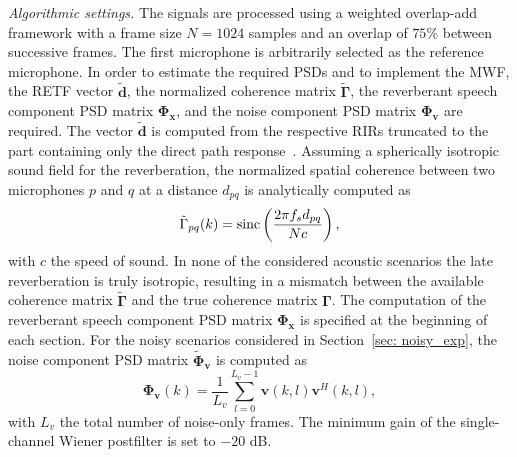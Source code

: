 \documentclass[10pt]{IEEEtran}
\begin{document}
{\emph{Algorithmic settings.}} \enspace
The signals are processed using a weighted overlap-add framework with a frame size $N = 1024$ samples and an overlap of $75 \%$ between successive frames. 
The first microphone is arbitrarily selected as the reference microphone.
In order to estimate the required PSDs and to implement the MWF, the RETF vector $\tilde{\mathbf{d}}$, the normalized coherence matrix $\tilde{\boldsymbol{\Gamma}}$, the reverberant speech component PSD matrix ${\mathbf{\Phi}}_{\mathbf{x}}$, and the noise component PSD matrix $\mathbf{\Phi}_{\mathbf{v}}$ are required.
The vector $\tilde{\mathbf{d}}$ is computed from the respective RIRs truncated to the part containing only the direct path response~\cite{Kuklasinski_EUSIPCO_2014g,Kuklasinksi_ICASSP_2015,kuklasinski_AES_2016}.
Assuming a spherically isotropic sound field for the reverberation, the normalized spatial coherence between two microphones $p$ and $q$ at a distance $d_{pq}$ is analytically computed as
\begin{equation}
\tilde{\Gamma}_{pq}(k) = {\rm sinc} \left( \frac{2 \pi f_s d_{pq}}{N c}\right),
\end{equation}
with $c$ the speed of sound.
In none of the considered acoustic scenarios the late reverberation is truly isotropic, resulting in a mismatch between the available coherence matrix $\tilde{\boldsymbol{\Gamma}}$ and the true coherence matrix $\boldsymbol{\Gamma}$.
The computation of the reverberant speech component PSD matrix $\mathbf{\Phi}_{\mathbf{x}}$ is specified at the beginning of each section.
For the noisy scenarios considered in Section~\ref{sec: noisy_exp}, the noise component PSD matrix $\tilde{\mathbf{\Phi}}_{\mathbf{v}}$ is computed as
\begin{equation}
\mathbf{\Phi}_{\mathbf{v}}(k) = \frac{1}{L_v} \sum_{l = 0}^{L_v-1} \mathbf{v}(k,l)\mathbf{v}^H(k,l),
\end{equation}
with $L_v$ the total number of noise-only frames.
The minimum gain of the single-channel Wiener postfilter is set to $-20$ dB.
\end{document}
